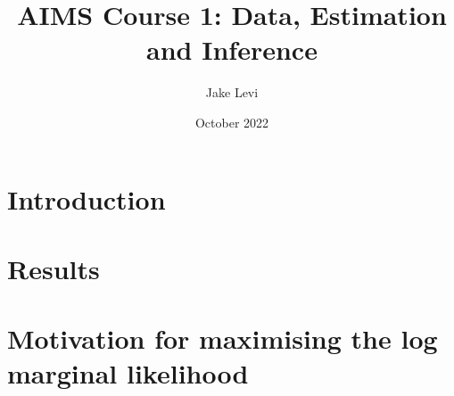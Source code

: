 \documentclass{article}
\title{AIMS Course 1: Data, Estimation and Inference}
\author{Jake Levi}
\date{October 2022}
\begin{document}
\maketitle
\section{Introduction} \label{section:intro}

\section{Results}








\appendix
\section{Motivation for maximising the log marginal likelihood}\label{appendix:why_lml}
\end{document}
